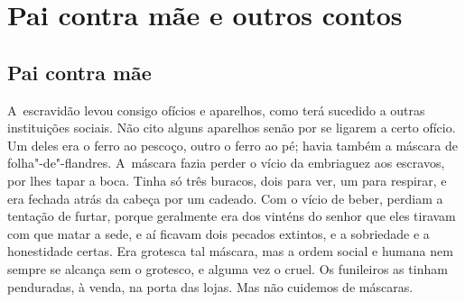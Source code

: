 
























\part{Pai contra mãe e outros contos}

\chapter{Pai contra mãe}

A~escravidão levou consigo ofícios e aparelhos, como terá sucedido a
outras instituições sociais. Não cito alguns aparelhos senão por se
ligarem a certo ofício. Um deles era o ferro ao pescoço, outro o ferro
ao pé; havia também a máscara de folha"-de"-flandres. A~máscara fazia
perder o vício da embriaguez aos escravos, por lhes tapar a boca. Tinha
só três buracos, dois para ver, um para respirar, e era fechada atrás da
cabeça por um cadeado. Com o vício de beber, perdiam a tentação de
furtar, porque geralmente era dos vinténs do senhor que eles tiravam com
que matar a sede, e aí ficavam dois pecados extintos, e a sobriedade e a
honestidade certas. Era grotesca tal máscara, mas a ordem social e
humana nem sempre se alcança sem o grotesco, e alguma vez o cruel. Os
funileiros as tinham penduradas, à venda, na porta das lojas. Mas não
cuidemos de máscaras.

